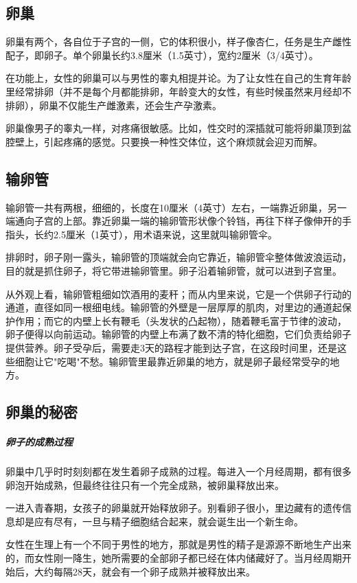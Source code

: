 \begin{enumerate}
\subsection{卵巢}

卵巢有两个，各自位于子宫的一侧，它的体积很小，样子像杏仁，任务是生产雌性配子，即卵子。单个卵巢长约3.8厘米（1.5英寸），宽约2厘米（3/4英寸）。

在功能上，女性的卵巢可以与男性的睾丸相提并论。为了让女性在自己的生育年龄里经常排卵（并不是每个月都能排卵，年龄变大的女性，有些时候虽然来月经却不排卵），卵巢不仅能生产雌激素，还会生产孕激素。

卵巢像男子的睾丸一样，对疼痛很敏感。比如，性交时的深插就可能将卵巢顶到盆腔壁上，引起疼痛的感觉。只要换一种性交体位，这个麻烦就会迎刃而解。

\subsection{输卵管}

输卵管一共有两根，细细的，长度在10厘米（4英寸）左右，一端靠近卵巢，另一端通向子宫的上部。靠近卵巢一端的输卵管形状像个铃铛，再往下样子像伸开的手指头，长约2.5厘米（1英寸），用术语来说，这里就叫输卵管伞。

排卵时，卵子刚一露头，输卵管的顶端就会向它靠近，输卵管伞整体做波浪运动，目的就是抓住卵子，将它带进输卵管里。卵子沿着输卵管，就可以进到子宫里。

从外观上看，输卵管粗细如饮酒用的麦秆；而从内里来说，它是一个供卵子行动的通道，直径如同一根细电线。输卵管的外壁是一层厚厚的肌肉，对里边的通道起保护作用；而它的内壁上长有鞭毛（头发状的凸起物），随着鞭毛富于节律的波动，卵子便得以向前运动。输卵管的内壁上布满了数不清的特化细胞，它们负责给卵子提供营养。卵子受孕后，需要走3天的路程才能到达子宫，在这段时间里，还是这些细胞让它"吃喝"不愁。输卵管里最靠近卵巢的地方，就是卵子最经常受孕的地方。

\subsection{卵巢的秘密}

\subparagraph{卵子的成熟过程}

卵巢中几乎时时刻刻都在发生着卵子成熟的过程。每进入一个月经周期，都有很多卵泡开始成熟，但最终往往只有一个完全成熟，被卵巢释放出来。

一进入青春期，女孩子的卵巢就开始释放卵子。别看卵子很小，里边藏有的遗传信息却是应有尽有，一旦与精子细胞结合起来，就会诞生出一个新生命。

女性在生理上有一个不同于男性的地方，那就是男性的精子是源源不断地生产出来的，而女性刚一降生，她所需要的全部卵子都已经在体内储藏好了。当月经周期开始后，大约每隔28天，就会有一个卵子成熟并被释放出来。


\end{enumerate}
